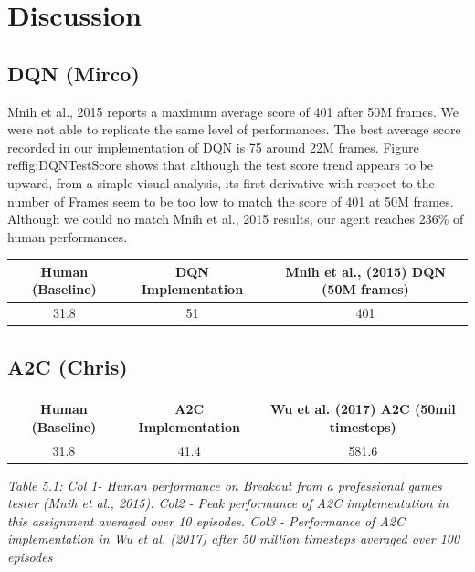 \documentclass{article}
\begin{document}
\section{Discussion}
    

\subsection{DQN (Mirco)}
Mnih et al., 2015 reports a maximum average score of 401 after 50M frames. We were not able to replicate the same level of performances. The best average score recorded in our implementation of DQN is 75 around 22M frames. Figure ref{fig:DQNTestScore} shows that although the test score trend appears to be upward, from a simple visual analysis, its first derivative with respect to the number of Frames seem to be too low to match the score of 401 at 50M frames. Although we could no match Mnih et al., 2015 results, our agent reaches 236\% of human performances.
\begin{table}[h!]
\centering
\begin{tabular}{|c | c | c |} 
 \hline
 Human (Baseline) & DQN Implementation & Mnih et al., (2015) DQN (50M frames) \\ [0.5ex] 
 \hline
 31.8 & 51 & 401  \\ 
 \hline
\end{tabular}
\end{table}


\subsection{A2C (Chris)}

\begin{table}[h!]
\centering
\begin{tabular}{|c | c | c |} 
 \hline
 Human (Baseline) & A2C Implementation & Wu et al. (2017) A2C (50mil timesteps) \\ [0.5ex] 
 \hline
 31.8 & 41.4 & 581.6  \\ 
 \hline
\end{tabular}
\end{table}
\emph{Table 5.1: Col 1- Human performance on Breakout from a professional games tester (Mnih et al., 2015). Col2 - Peak performance of A2C implementation in this assignment averaged over 10 episodes. Col3 - Performance of A2C implementation in Wu et al. (2017)  after 50 million timesteps averaged over 100 episodes}
\end{document}
